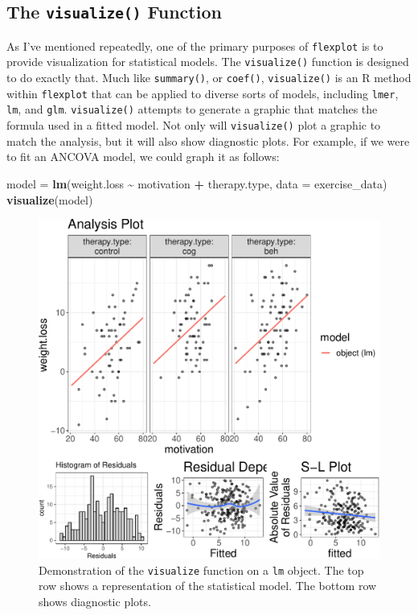\documentclass[
  man]{apa6}
\newenvironment{Shaded}{\begin{snugshade}}{\end{snugshade}}
\newcommand{\DataTypeTok}[1]{\textcolor[rgb]{0.13,0.29,0.53}{#1}}
\newcommand{\KeywordTok}[1]{\textcolor[rgb]{0.13,0.29,0.53}{\textbf{#1}}}
\newcommand{\NormalTok}[1]{#1}
\newcommand{\OperatorTok}[1]{\textcolor[rgb]{0.81,0.36,0.00}{\textbf{#1}}}
\newcommand{\StringTok}[1]{\textcolor[rgb]{0.31,0.60,0.02}{#1}}
\begin{document}
\hypertarget{the-visualize-function}{%
\subsection{\texorpdfstring{The \texttt{visualize()} Function}{The visualize() Function}}\label{the-visualize-function}}

As I've mentioned repeatedly, one of the primary purposes of \texttt{flexplot} is to provide visualization for statistical models. The \texttt{visualize()} function is designed to do exactly that. Much like \texttt{summary()}, or \texttt{coef()}, \texttt{visualize()} is an R method within \texttt{flexplot} that can be applied to diverse sorts of models, including \texttt{lmer}, \texttt{lm}, and \texttt{glm}. \texttt{visualize()} attempts to generate a graphic that matches the formula used in a fitted model. Not only will \texttt{visualize()} plot a graphic to match the analysis, but it will also show diagnostic plots. For example, if we were to fit an ANCOVA model, we could graph it as follows:

\small

\begin{Shaded}
\begin{Highlighting}[]
\NormalTok{model =}\StringTok{ }\KeywordTok{lm}\NormalTok{(weight.loss }\OperatorTok{\textasciitilde{}}\StringTok{ }\NormalTok{motivation }\OperatorTok{+}\StringTok{ }\NormalTok{therapy.type, }
           \DataTypeTok{data =}\NormalTok{ exercise\_data)}
\KeywordTok{visualize}\NormalTok{(model)}
\end{Highlighting}
\end{Shaded}

\begin{figure}
\centering
\includegraphics{flexplot_psychmeth_files/figure-latex/ancova-1.pdf}
\caption{\label{fig:ancova}Demonstration of the \texttt{visualize} function on a \texttt{lm} object. The top row shows a representation of the statistical model. The bottom row shows diagnostic plots. \label{fig:ancova}}
\end{figure}
\end{document}
